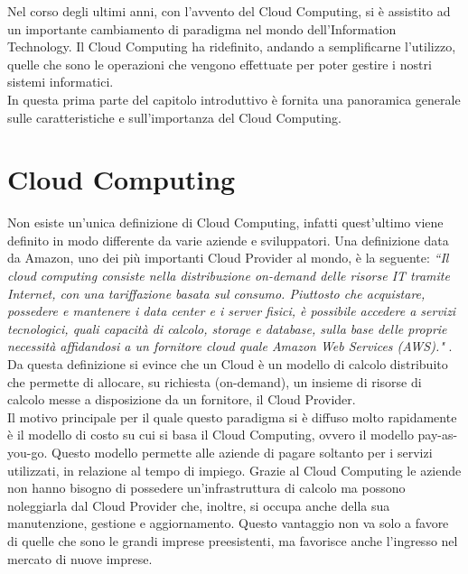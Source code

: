 Nel corso degli ultimi anni, con l'avvento del Cloud Computing, si è assistito ad un importante cambiamento di paradigma nel mondo dell'Information Technology. Il Cloud Computing ha ridefinito, andando a semplificarne l'utilizzo, quelle che sono le operazioni che vengono effettuate per poter gestire i nostri sistemi informatici. \\
In questa prima parte del capitolo introduttivo è fornita una panoramica generale sulle caratteristiche e sull'importanza del Cloud Computing.

\section{Cloud Computing}
Non esiste un'unica definizione di Cloud Computing, infatti quest'ultimo viene definito in modo differente da varie aziende e sviluppatori. Una definizione data da Amazon, uno dei più importanti Cloud Provider al mondo, è la seguente: \textit{“Il cloud computing consiste nella distribuzione on-demand delle risorse IT tramite Internet, con una tariffazione basata sul consumo. Piuttosto che acquistare, possedere e mantenere i data center e i server fisici, è possibile accedere a servizi tecnologici, quali capacità di calcolo, storage e database, sulla base delle proprie necessità affidandosi a un fornitore cloud quale Amazon Web Services (AWS)."} \cite{aws}. \\
Da questa definizione si evince che un Cloud è un modello di calcolo distribuito che permette di allocare, su richiesta (on-demand), un insieme di risorse di calcolo messe a disposizione da un fornitore, il Cloud Provider. \\
Il motivo principale per il quale questo paradigma si è diffuso molto rapidamente è il modello di costo su cui si basa il Cloud Computing, ovvero il modello pay-as-you-go. Questo modello permette alle aziende di pagare soltanto per i servizi utilizzati, in relazione al tempo di impiego. Grazie al Cloud Computing le aziende non hanno bisogno di possedere un'infrastruttura di calcolo ma possono noleggiarla dal Cloud Provider che, inoltre, si occupa anche della sua manutenzione, gestione e aggiornamento. Questo vantaggio non va solo a favore di quelle che sono le grandi imprese preesistenti, ma favorisce anche l'ingresso nel mercato di nuove imprese.

